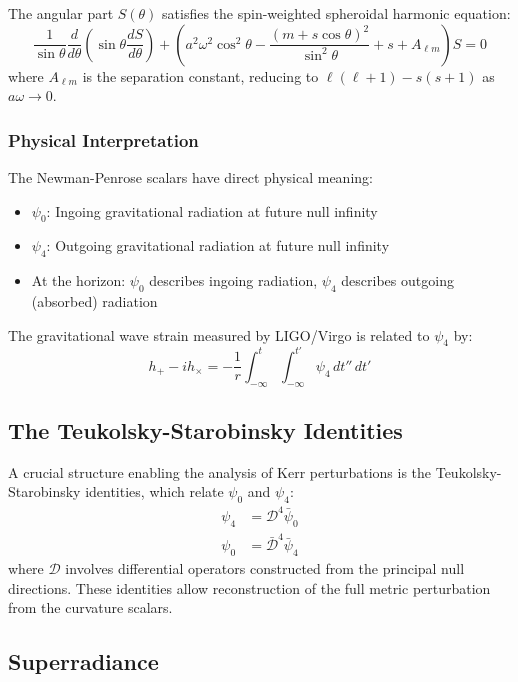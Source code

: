 \documentclass[12pt,a4paper]{article}
\begin{document}
The angular part $S(\theta)$ satisfies the spin-weighted spheroidal harmonic equation:
\begin{equation}
\frac{1}{\sin\theta}\frac{d}{d\theta}\left(\sin\theta\frac{dS}{d\theta}\right) + \left(a^2\omega^2\cos^2\theta - \frac{(m + s\cos\theta)^2}{\sin^2\theta} + s + A_{\ell m}\right)S = 0
\end{equation}
where $A_{\ell m}$ is the separation constant, reducing to $\ell(\ell+1) - s(s+1)$ as $a\omega \to 0$.

\subsubsection{Physical Interpretation}

The Newman-Penrose scalars have direct physical meaning:
\begin{itemize}
    \item $\psi_0$: Ingoing gravitational radiation at future null infinity
    \item $\psi_4$: Outgoing gravitational radiation at future null infinity
    \item At the horizon: $\psi_0$ describes ingoing radiation, $\psi_4$ describes outgoing (absorbed) radiation
\end{itemize}

The gravitational wave strain measured by LIGO/Virgo is related to $\psi_4$ by:
\begin{equation}
h_+ - ih_\times = -\frac{1}{r}\int_{-\infty}^{t}\int_{-\infty}^{t'}\psi_4\,dt''\,dt'
\end{equation}

\subsection{The Teukolsky-Starobinsky Identities}

A crucial structure enabling the analysis of Kerr perturbations is the Teukolsky-Starobinsky identities, which relate $\psi_0$ and $\psi_4$:
\begin{align}
\psi_4 &= \mathcal{D}^4 \bar{\psi}_0 \\
\psi_0 &= \bar{\mathcal{D}}^4 \bar{\psi}_4
\end{align}
where $\mathcal{D}$ involves differential operators constructed from the principal null directions. These identities allow reconstruction of the full metric perturbation from the curvature scalars.

\subsection{Superradiance}
\end{document}
